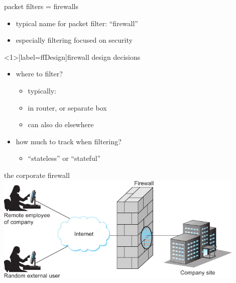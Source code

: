 \begin{frame}{packet filters = firewalls}
    \begin{itemize}
    \item typical name for packet filter: ``firewall''
    \item especially filtering focused on security
    \end{itemize}
\end{frame}

\begin{frame}<1>[label=ffDesign]{firewall design decisions}
    \begin{itemize}
    \item where to filter?
        \begin{itemize}
        \item typically: 
        \item in router, or separate box
        \item can also do elsewhere
        \end{itemize}
    \item how much to track when filtering?
        \begin{itemize}
        \item ``stateless'' or ``stateful''
        \end{itemize}
    \end{itemize}
\end{frame}

\begin{frame}{the corporate firewall}
\includegraphics[width=0.9\textwidth]{../fire/sysapp-fig214}
\end{frame}


